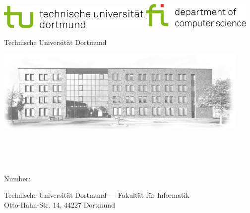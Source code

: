 \setlength{\marginparwidth}{0em}%
\setlength{\marginparsep}{0em}%
\areaset{21cm}{32cm} %

\begin{titlepage}
    \begin{center}
        \large  

        \hfill
        
	\includegraphics[height=1.2cm]{FrontBackmatter/images/tudologo.png} \hspace{6cm} \includegraphics[height=1.3cm]{FrontBackmatter/images/fi_logo_english_jpg.jpg} \\ 
	
	\vspace{3.5cm}
	
        \begingroup
            \color{Maroon}
        \endgroup
	\medskip
	
        Technische Universität Dortmund
        \bigskip
        
	\includegraphics[height=4cm]{FrontBackmatter/images/oh14_60.png}
	\vspace{2cm}
	
       {\LARGE \myFormattedTitle }\\
       \bigskip
       {\large \myName } \\
       \medskip
	\myChair \\

	 \vfill
        \vfill
        
        Number:~\myVolume \\
        \myTime 
        
        \vfill
        \vfill
        
	Technische Universität Dortmund --- Fakultät für Informatik\\
	Otto-Hahn-Str. 14, 44227 Dortmund
    \end{center}        
\end{titlepage}   

\areaset[5mm]{350pt}{699pt} %
\setlength{\marginparwidth}{7em}%
\setlength{\marginparsep}{2em}%
